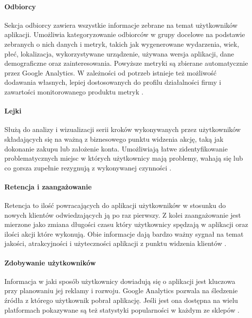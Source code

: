 \paragraph{Odbiorcy}
\label{par:ga-audiences}
Sekcja odbiorcy zawiera wszystkie informacje zebrane na temat użytkowników aplikacji. Umożliwia kategoryzowanie odbiorców w grupy docelowe na podstawie zebranych o nich danych i metryk, takich jak wygenerowane wydarzenia, wiek, płeć, lokalizacja, wykorzystywane urządzenie, używana wersja aplikacji, dane demograficzne oraz zainteresowania. Powyższe metryki są zbierane automatycznie przez Google Analytics. W zależności od potrzeb istnieje też możliwość dodawania własnych, lepiej dostosowanych do profilu działalności firmy i zawartości monitorowanego produktu metryk \cite{GA_Audiences}.

\paragraph{Lejki}
\label{par:ga-funnels}
Służą do analizy i wizualizacji serii kroków wykonywanych przez użytkowników składających się na ważną z biznesowego punktu widzenia akcję, taką jak dokonanie zakupu lub założenie konta. Umożliwiają łatwe zidentyfikowanie problematycznych miejsc w których użytkownicy mają problemy, wahają się lub co gorsza  zupełnie rezygnują z wykonywanej czynności \cite{GA_Funnels}.

\paragraph{Retencja i zaangażowanie} 
\label{par:ga-retention}
Retencja to ilość powracających do aplikacji  użytkowników w stosunku do nowych klientów odwiedzających ją po raz pierwszy. Z kolei zaangażowanie jest mierzone jako zmiana długości czasu który użytkownicy spędzają w aplikacji oraz ilości akcji które wykonują. Obie informacje dają bardzo ważny sygnał na temat jakości, atrakcyjności i użyteczności aplikacji z punktu widzenia klientów \cite{GA_Retention}.

\paragraph{Zdobywanie użytkowników}
Informacja w jaki sposób użytkownicy dowiadują się o aplikacji jest kluczowa przy planowaniu jej reklamy i rozwoju. Google Analytics pozwala na śledzenie źródła z którego użytkownik pobrał aplikację. Jeśli jest ona dostępna na wielu platformach pokazywane są też statystyki popularności w każdym ze sklepów \cite{GA_Aquisition}.
